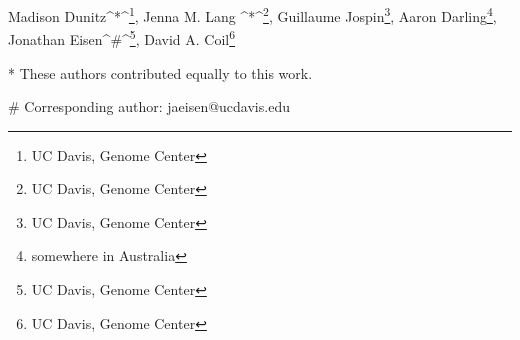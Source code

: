 Madison Dunitz^*^\footnote{UC Davis, Genome Center}, Jenna M. Lang ^*^\footnote{UC Davis, Genome Center}, Guillaume Jospin\footnote{UC Davis, Genome Center}, Aaron Darling\footnote{somewhere in Australia}, Jonathan Eisen^\#^\footnote{UC Davis, Genome Center}, David A. Coil\footnote{UC Davis, Genome Center} 

* These authors contributed equally to this work.

\# Corresponding author: jaeisen@ucdavis.edu